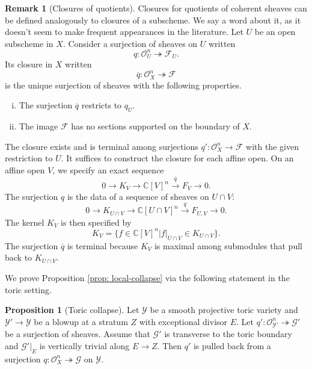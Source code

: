 \documentclass[11pt]{amsart}
\theoremstyle{definition}
\theoremstyle{definition}
\newtheorem{proposition}[theorem]{Proposition}
\newtheorem{remark}[theorem]{Remark}
\begin{document}
\begin{remark}[Closures of quotients]\label{rem: closures}
Closures for quotients of coherent sheaves can be defined analogously to closures of a subscheme. We say a word about it, as it doesn't seem to make frequent appearances in the literature. Let $U$ be an open subscheme in $X$. Consider a surjection of sheaves on $U$ written $$q\colon \mathcal{O}_U^n \twoheadrightarrow \mathcal{F}_U.$$ Its closure in $X$ written $$\overline{q}\colon \mathcal{O}_X^n \twoheadrightarrow \mathcal{F}$$ is the unique surjection of sheaves with the following properties.

\begin{enumerate}[(i)]
    \item The surjection $\overline{q}$ restricts to $q_U$.
    \item The image $\mathcal{F}$ has no sections supported on the boundary of $X$.
\end{enumerate}

The closure exists and is terminal among surjections $q'\colon\mathcal{O}_X^n \rightarrow \mathcal{F}$ with the given restriction to $U$. It suffices to construct the closure for each affine open. On an affine open $V$, we specify an exact sequence $$ 0 \rightarrow K_V \rightarrow \mathbb{C}[V]^n\xrightarrow{\overline{q}} F_V\rightarrow 0.$$ The surjection $q$ is the data of a sequence of sheaves on $U \cap V$:
    $$ 0 \rightarrow K_{U \cap V} \rightarrow \mathbb{C}[U\cap V]^n\xrightarrow{q} F_{U,V}\rightarrow 0.$$
    The kernel $K_V$ is then specified by $$K_V = \{f \in \mathbb{C}[V]^n| f|_{U \cap V} \in K_{U \cap V}\}.$$ The surjection $\overline{q}$ is terminal because $K_V$ is maximal among submodules that pull back to $K_{U \cap V}$.
\end{remark}

We prove Proposition \ref{prop: local-collapse} via the following statement in the toric setting. 

\begin{proposition}[Toric collapse]\label{prop: toric-collapse}
Let $\mathcal Y$ be a smooth projective toric variety and $\mathcal Y'\to \mathcal Y$ be a blowup at a stratum $Z$ with exceptional divisor $E$. Let $q' \colon \mathcal O_{\mathcal Y'}^n \twoheadrightarrow\mathcal G'$ be a surjection of sheaves. Assume that $\mathcal G'$ is transverse to the toric boundary and $\mathcal G'|_E$ is vertically trivial along $E\to Z$. Then $q'$ is pulled back from a surjection $q\colon \mathcal{O}_X^n\twoheadrightarrow \mathcal G$ on $\mathcal Y$. 
\end{proposition}
\end{document}
